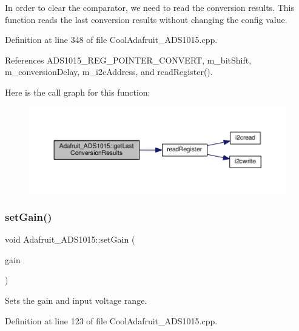 In order to clear the comparator, we need to read the conversion results. This function reads the last conversion results without changing the config value. 



Definition at line 348 of file Cool\+Adafruit\+\_\+\+A\+D\+S1015.\+cpp.



References A\+D\+S1015\+\_\+\+R\+E\+G\+\_\+\+P\+O\+I\+N\+T\+E\+R\+\_\+\+C\+O\+N\+V\+E\+RT, m\+\_\+bit\+Shift, m\+\_\+conversion\+Delay, m\+\_\+i2c\+Address, and read\+Register().

Here is the call graph for this function\+:
\nopagebreak
\begin{figure}[H]
\begin{center}
\leavevmode
\includegraphics[width=350pt]{df/df6/class_adafruit___a_d_s1015_ad8f36d80847020778425107f6451a8c2_cgraph}
\end{center}
\end{figure}
\mbox{\label{class_adafruit___a_d_s1015_a399441eace686975ff22937cbe45cc50}} 
\subsubsection{\texorpdfstring{set\+Gain()}{setGain()}}
{\footnotesize\ttfamily void Adafruit\+\_\+\+A\+D\+S1015\+::set\+Gain (\begin{DoxyParamCaption}\item[{\hyperlink{_cool_adafruit___a_d_s1015_8h_a3d6c0e15829a207b9155890811fa4781}{ads\+Gain\+\_\+t}}]{gain }\end{DoxyParamCaption})}



Sets the gain and input voltage range. 



Definition at line 123 of file Cool\+Adafruit\+\_\+\+A\+D\+S1015.\+cpp.



